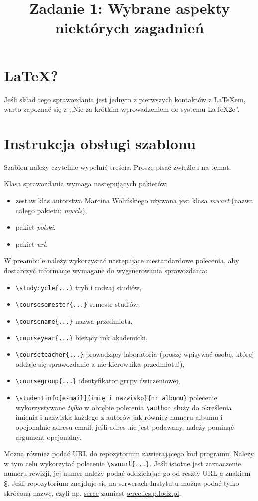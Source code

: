 \documentclass{classrep}
\author{
  \studentinfo{Julian Brzechwa}{540282} \and
  \studentinfo{Jan Mickiewicz}{823941} \and
  \studentinfo{Adam Tuwim}{561004}
}
\title{Zadanie 1: Wybrane aspekty niektórych zagadnień}
\begin{document}
\maketitle

\section{\LaTeX?}
Jeśli skład tego sprawozdania jest jednym z pierwszych kontaktów z
\LaTeX\dywiz em, warto zapoznać się z ,,Nie za krótkim wprowadzeniem do
systemu \LaTeX2e''\cite{l2short}.

\section{Instrukcja obsługi szablonu}
Szablon należy czytelnie wypełnić treścia. Proszę pisać zwięźle i na temat.

Klasa sprawozdania wymaga następujących pakietów:
\begin{itemize}
  \item zestaw klas autorstwa Marcina Wolińskiego \ppauza używana jest klasa
    \emph{mwart} (nazwa całego pakietu: \emph{mwcls}),
  \item pakiet \emph{polski},
  \item pakiet \emph{url}.
\end{itemize}

W preambule należy wykorzystać następujące niestandardowe polecenia, aby
dostarczyć informacje wymagane do wygenerowania sprawozdania:
\begin{itemize}
  \item \verb+\studycycle{...}+ \ppauza tryb i rodzaj studiów,
  \item \verb+\coursesemester{...}+ \ppauza semestr studiów,
  \item \verb+\coursename{...}+ \ppauza nazwa przedmiotu,
  \item \verb+\courseyear{...}+ \ppauza bieżący rok akademicki,
  \item \verb+\courseteacher{...}+ \ppauza prowadzący laboratoria (proszę
    wpisywać osobę, której oddaje się sprawozdanie a nie kierownika
    przedmiotu!),
  \item \verb+\coursegroup{...}+ \ppauza identyfikator grupy ćwiczeniowej,
  \item \verb+\studentinfo[e-mail]{imię i nazwisko}{nr albumu}+ \ppauza
    polecenie wykorzystywane \emph{tylko} w obrębie polecenia \verb+\author+
    służy do określenia imienia i nazwiska każdego z autorów jak również
    numeru albumu i opcjonalnie adresu e\dywiz mail; jeśli adres nie jest
    podawany, należy pominąć argument opcjonalny.
\end{itemize}
Można również podać URL do repozytorium zawierającego kod programu. Należy w
tym celu wykorzytać polecenie \verb+\svnurl{...}+. Jeśli istotne jest
zaznaczenie numeru rewizji, jej numer należy podać oddzielając go od reszty
URL-a znakiem \verb+@+. Jeśli repozytorium znajduje się na serwerach Instytutu
można podać tylko skróconą nazwę, czyli np. \url{serce} zamiast
\url{serce.ics.p.lodz.pl}.
\end{document}
